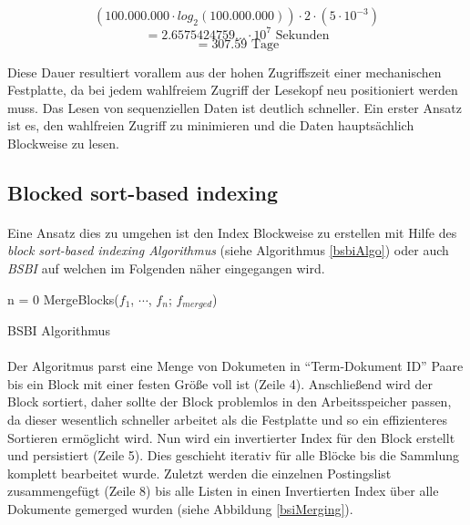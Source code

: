 \[(100.000.000 \cdot log_2 (100.000.000)) \cdot 2 \cdot (5 \cdot 10^{-3}) \]
\[ = 2.6575424759... \cdot 10^7 \text{ Sekunden}\]
\[ = 307.59 \text{ Tage} \]

Diese Dauer resultiert vorallem aus der hohen Zugriffszeit einer mechanischen Festplatte, da bei jedem wahlfreiem Zugriff der Lesekopf neu positioniert werden muss. Das Lesen von sequenziellen Daten ist deutlich schneller. Ein erster Ansatz ist es, den wahlfreien Zugriff zu minimieren und die Daten hauptsächlich Blockweise zu lesen.
\par

\subsection{Blocked sort-based indexing}
\paragraph{}
Eine Ansatz dies zu umgehen ist den Index Blockweise zu erstellen mit Hilfe des \textit{block sort-based indexing Algorithmus} (siehe Algorithmus \ref{bsbiAlgo}) oder auch \textit{BSBI} auf welchen im Folgenden näher eingegangen wird.
\par
\begin{algorithm}
 n = 0\;
  MergeBlocks($f_1$, $\cdots$, $f_n$; $f_{merged}$)\;
\caption{BSBI Algorithmus} \label{bsbiAlgo}
\end{algorithm}

\paragraph{}
Der Algoritmus parst eine Menge von Dokumeten in \enquote{Term-Dokument ID} Paare bis ein Block mit einer festen Größe voll ist (Zeile 4). Anschließend wird der Block sortiert, daher sollte der Block problemlos in den Arbeitsspeicher passen, da dieser wesentlich schneller arbeitet als die Festplatte und so ein effizienteres Sortieren ermöglicht wird. Nun wird ein invertierter Index für den Block erstellt und persistiert (Zeile 5). Dies geschieht iterativ für alle Blöcke bis die Sammlung komplett bearbeitet wurde. Zuletzt werden die einzelnen Postingslist zusammengefügt (Zeile 8) bis alle Listen in einen Invertierten Index über alle Dokumente gemerged wurden (siehe Abbildung \ref{bsiMerging}). 
\par


